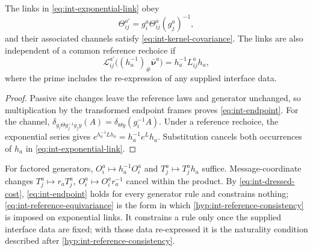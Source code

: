 The links in \cref{eq:int-exponential-link} obey
\begin{equation}
\Theta_{ij}^{a\prime}=g_i^a\Theta_{ij}^a(g_j^a)^{-1},
\label{eq:int-endpoint}
\end{equation}
and their associated channels satisfy \cref{eq:int-kernel-covariance}. The links are also independent of a common reference rechoice if
\begin{equation}
\mathcal L_{ij}^{a\prime}\bigl((h_a^{-1})_\#\bar{\boldsymbol\nu}^a\bigr)
=h_a^{-1}L_{ij}^a h_a,
\label{eq:int-reference-equivariance}
\end{equation}
where the prime includes the re-expression of any supplied interface data.
\begin{proof}
Passive site changes leave the reference laws and generator unchanged, so multiplication by the transformed endpoint frames proves \cref{eq:int-endpoint}. For the channel, $\delta_{g_i\Theta g_j^{-1}g_jy}(A)=\delta_{\Theta y}(g_i^{-1}A)$. Under a reference rechoice, the exponential series gives $e^{h_a^{-1}Lh_a}=h_a^{-1}e^Lh_a$. Substitution cancels both occurrences of $h_a$ in \cref{eq:int-exponential-link}.
\end{proof}
For factored generators, $O_i^a\mapsto h_a^{-1}O_i^a$ and $T_j^a\mapsto T_j^a h_a$ suffice. Message-coordinate changes $T_j^a\mapsto r_aT_j^a$, $O_i^a\mapsto O_i^ar_a^{-1}$ cancel within the product. By \cref{eq:int-dressed-cost}, \cref{eq:int-endpoint} holds for every generator rule and constrains nothing; \cref{eq:int-reference-equivariance} is the form in which \cref{hyp:int-reference-consistency} is imposed on exponential links. It constrains a rule only once the supplied interface data are fixed; with those data re-expressed it is the naturality condition described after \cref{hyp:int-reference-consistency}.

